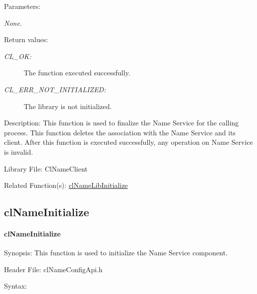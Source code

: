 \begin{flushleft}
\begin{Desc}
\begin{verbatim}
\end{verbatim}
\normalsize
\end{Desc}
\begin{Desc}
\item[Parameters:]
\begin{description}
\item[{\em None.}]\end{description}
\end{Desc}
\begin{Desc}
\item[Return values:]
\begin{description}
\item[{\em CL\_\-OK:}]The function executed successfully.
\item[{\em CL\_\-ERR\_\-NOT\_\-INITIALIZED:}]The library is not initialized.
\end{description}
\end{Desc}
\begin{Desc}
\item[Description:]This function is used to finalize the Name Service for the calling process. This function deletes the association with the Name Service and its
client. After this function is executed successfully, any operation on Name Service is invalid. 
\end{Desc}
\begin{Desc}
\item[Library File:]Cl\-Name\-Client\end{Desc}
\begin{Desc}
\item[Related Function(s):]\hyperlink{pagens101}{cl\-Name\-Lib\-Initialize} \end{Desc}
\newpage


\subsection{clNameInitialize}
\hypertarget{pagens201}{}\paragraph{cl\-Name\-Initialize}\label{pagens201}
\begin{Desc}
\item[Synopsis:]This function is used to initialize the Name Service component.\end{Desc}
\begin{Desc}
\item[Header File:]clNameConfigApi.h\end{Desc}
\begin{Desc}
\item[Syntax:]


\end{Desc}
\end{flushleft}
